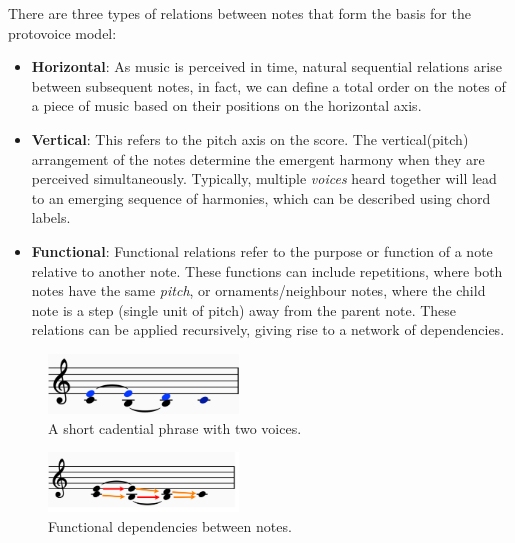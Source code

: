 \documentclass[12pt,a4paper,twoside,openright]{report}
\theoremstyle{definition}
\begin{document}
There are three types of relations between notes that form the basis for the protovoice model:

\begin{itemize}
  \item \textbf{Horizontal}: As music is perceived in time, natural sequential relations arise between subsequent notes, in fact, we can define a total order on the notes of a piece of music based on their positions on the horizontal axis.
  \item \textbf{Vertical}: This refers to the pitch axis on the score. The vertical(pitch) arrangement of the notes determine the emergent harmony when they are perceived simultaneously. Typically, multiple \textit{voices} heard together will lead to an emerging sequence of harmonies, which can be described using chord labels.
  \item \textbf{Functional}: Functional relations refer to the purpose or function of a note relative to another note. These functions can include repetitions, where both notes have the same \textit{pitch}, or ornaments/neighbour notes, where the child note is a step (single unit of pitch) away from the parent note. These relations can be applied recursively, giving rise to a network of dependencies.
\end{itemize}

\begin{figure}
  \centering
  \includegraphics[width=0.45\textwidth]{prep/cadencevoices}
  \captionsetup{width=.9\linewidth}
  \caption{A short cadential phrase with two voices.}
  \label{fig:cadenceVoices}
\end{figure}

\begin{figure}
  \centering
  \includegraphics[width=0.45\textwidth]{prep/cadencefunctions}
  \captionsetup{width=.9\linewidth}
  \caption{Functional dependencies between notes.}
  \label{fig:cadenceFunctions}
\end{figure}
\end{document}
